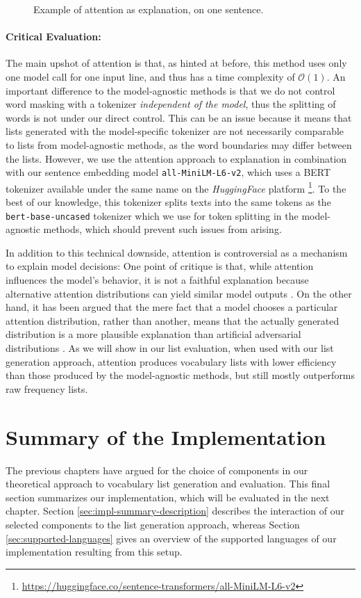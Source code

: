 \begin{figure}[H]
	
	\caption{Example of attention as explanation, on one sentence.}
	\label{fig:attention}
\end{figure}

\paragraph{Critical Evaluation:}
The main upshot of attention is that, as hinted at before, this method uses only one model call for one input line, and thus has a time complexity of $\mathcal{O}(1)$.
An important difference to the model-agnostic methods is that we do not control word masking with a tokenizer \textit{independent of the model}, thus the splitting of words is not under our direct control.
This can be an issue because it means that lists generated with the model-specific tokenizer are not necessarily comparable to lists from model-agnostic methods, as the word boundaries may differ between the lists.
However, we use the attention approach to explanation in combination with our sentence embedding model \texttt{all-MiniLM-L6-v2}, which uses a BERT tokenizer available under the same name on the \textit{HuggingFace} platform \footnote{\url{https://huggingface.co/sentence-transformers/all-MiniLM-L6-v2}}.
To the best of our knowledge, this tokenizer splits texts into the same tokens as the \texttt{bert-base-uncased} tokenizer which we use for token splitting in the model-agnostic methods, which should prevent such issues from arising.

In addition to this technical downside, attention is controversial as a mechanism to explain model decisions:
One point of critique is that, while attention influences the model's behavior, it is not a faithful explanation because alternative attention distributions can yield similar model outputs \cite{jainAttentionNotExplanation2019}.
On the other hand, it has been argued that the mere fact that a model chooses a particular attention distribution, rather than another, means that the actually generated distribution is a more plausible explanation than artificial adversarial distributions \cite{wiegreffeAttentionNotNot2019}.
As we will show in our list evaluation, when used with our list generation approach, attention produces vocabulary lists with lower efficiency than those produced by the model-agnostic methods, but still mostly outperforms raw frequency lists.


\section{Summary of the Implementation} \label{sec:implementation-final}
The previous chapters have argued for the choice of components in our theoretical approach to vocabulary list generation and evaluation.
This final section summarizes our implementation, which will be evaluated in the next chapter.
Section \ref{sec:impl-summary-description} describes the interaction of our selected components to the list generation approach, whereas Section \ref{sec:supported-languages} gives an overview of the supported languages of our implementation resulting from this setup.

